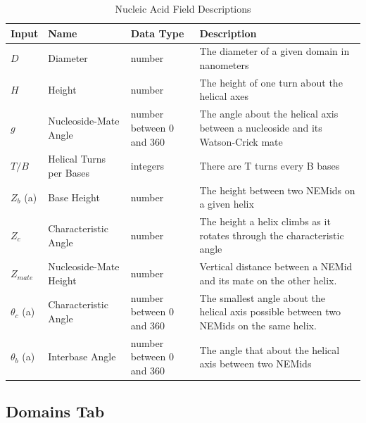 \documentclass[titlepage]{article}
\begin{document}
\begin{longtable}{|p{.5in}|p{1in}|p{1in}|p{2.2in}|}
	\caption{\label{tab:setting-descriptions}Nucleic Acid Field Descriptions} \\
	
	Input & Name & Data Type & Description \\
	\hline
	
	$D$ & Diameter & number & The diameter of a given domain in nanometers \\ 
	\hline
	
	$H$ & Height & number & The height of one turn about the helical axes \\ 
	\hline
	
	$g$ & Nucleoside-Mate Angle & number between 0 and 360 & The angle about the helical axis between a nucleoside and its Watson-Crick mate \\ 
	\hline
	
	$T/B$ & Helical Turns per Bases & integers & There are T turns every B bases \\ 
	\hline
	
	$Z_b$ (a) & Base Height & number & The height between two NEMids on a given helix \\ 
	\hline
	
	$Z_c$ & Characteristic Angle & number & The height a helix climbs as it rotates through the characteristic angle \\ 
	\hline
	
	$Z_{mate}$ & Nucleoside-Mate Height & number & Vertical distance between a NEMid and its mate on the other helix. \\ 
	\hline
	
	$\theta_{c}$ (a) & Characteristic Angle & number between 0 and 360 & The smallest angle about the helical axis possible between two NEMids on the same helix. \\ 
	\hline
	
	$\theta_{b}$ (a) & Interbase Angle & number between 0 and 360 & The angle that about the helical axis between two NEMids \\
\end{longtable}

\subsection{Domains Tab}
\end{document}
